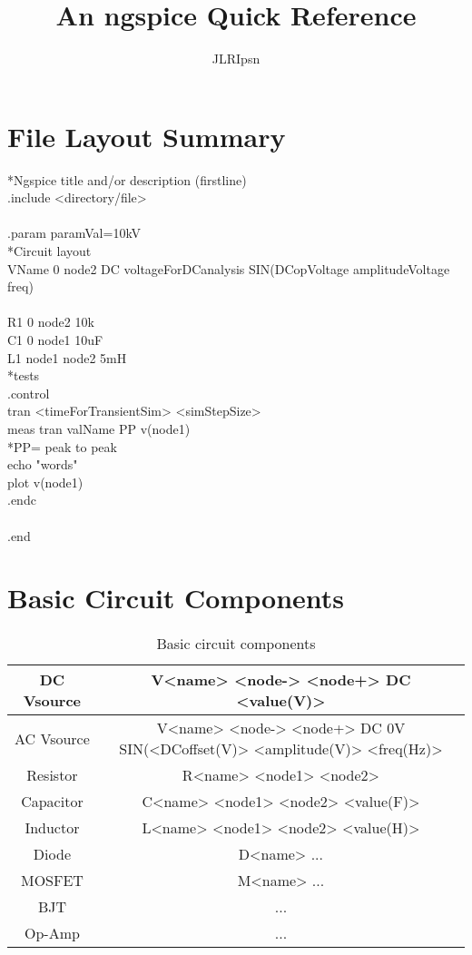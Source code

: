 \documentclass[a4paper]{article}
\author{JLRIpsn}
\title{An ngspice Quick Reference}
\begin{document}
\maketitle
\section{File Layout Summary}

*Ngspice title and/or description (firstline) \\
.include <directory/file>\\
\\
.param paramVal=10kV\\
*Circuit layout\\
VName 0 node2 DC voltageForDCanalysis SIN(DCopVoltage amplitudeVoltage freq)\\
\\
R1 0 node2 10k\\
C1 0 node1 10uF\\
L1 node1 node2 5mH\\

*tests\\
.control\\
tran <timeForTransientSim> <simStepSize>\\
meas tran valName PP v(node1)\\
*PP= peak to peak\\
echo "words"\\
plot v(node1)\\
.endc\\
\\
.end
\section{Basic Circuit Components}
\begin{table}[!ht]
	\begin{tabular}{| c | c |}
		\hline
		DC Vsource & V<name> <node-> <node+> DC <value(V)> \\
		\hline
		AC Vsource & V<name> <node-> <node+> DC 0V SIN(<DCoffset(V)> <amplitude(V)> <freq(Hz)> \\
		\hline
		Resistor & R<name> <node1> <node2> \\
		\hline
		Capacitor & C<name> <node1> <node2> <value(F)> \\
		\hline
		Inductor & L<name> <node1> <node2> <value(H)> \\
		\hline
		Diode & D<name> ... \\
		\hline
		MOSFET & M<name> ... \\
		\hline
		BJT & ... \\
		\hline
		Op-Amp &  ... \\
		\hline
	\end{tabular}
	\caption{\label{tab:comps} Basic circuit components}
\end{table}
\end{document}

